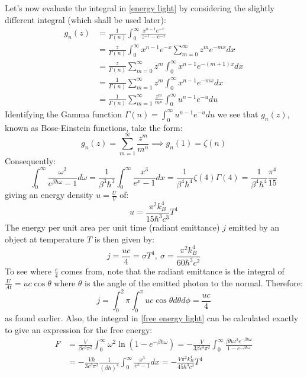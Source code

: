 \documentclass[a4paper,11pt,oneside]{book}
\begin{document}
Let's now evaluate the integral in \eqref{energy light} by considering the slightly different integral (which shall be used later):
\begin{align}
    g_n(z) &= \frac{1}{\Gamma(n)} \int_0^\infty \frac{x^{n-1}e^{-x}}{z^{-1}-e^{-x}}\\
    &=\frac{z}{\Gamma(n)} \int_0^\infty x^{n-1} e^{-x} \sum_{m=0}^\infty z^m e^{-mx} dx\\
    &=\frac{z}{\Gamma(n)}\sum_{m=0}^\infty z^m\int_0^\infty x^{n-1}  e^{-(m+1)x} dx\\
    &= \frac{1}{\Gamma(n)}\sum_{m=1}^\infty z^m\int_0^\infty  x^{n-1}  e^{-mx}dx\\
    &= \frac{1}{\Gamma(n)} \sum_{m=1}^\infty \frac{z^m}{m^n}\int_0^\infty u^{n-1} e^{-u} du 
\end{align}
Identifying the Gamma function $\Gamma(n) = \int_0^\infty u^{n-1} e^{-u} du $ we see that $g_n(z)$, known as Bose-Einstein functions, take the form:
\begin{equation}
    \boxed{g_n(z) =  \sum_{m=1}^\infty \frac{z^m}{m^n} \implies g_n(1) = \zeta(n)}
\end{equation}
Consequently:
\begin{equation}
    \int_0^\infty \frac{\omega^3}{e^{\beta \hbar \omega}-1}d\omega = \frac{1}{\beta^3 \hbar^3} \int_0^\infty \frac{x^3}{e^x-1} dx = \frac{1}{\beta^4 \hbar^4} \zeta(4) \Gamma(4)=\frac{1}{\beta^4 \hbar^4} \frac{\pi^4}{15}
\end{equation}
giving an energy density $u=\frac{U}{V}$ of:
\begin{equation}
   \boxed{u = \frac{\pi^2k_B^4}{15\hbar^3 c^3}T^4}
\end{equation}
The energy per unit area per unit time (radiant emittance) $j$ emitted by an object at temperature $T$ is then given by:
\begin{equation}
     \boxed{j = \frac{uc}{4}=\sigma T^4, \ \sigma = \frac{\pi^2k_B^4}{60\hbar^3 c^2}}
\end{equation}
To see where $\frac{c}{4}$ comes from, note that the radiant emittance is the integral of $\frac{U}{A t} = uc \cos \theta$ where $\theta$ is the angle of the emitted photon to the normal. Therefore:
\begin{equation}
    j = \int_0^2\pi \int_0^\pi uc \cos \theta d\theta d\phi = \frac{uc}{4}
\end{equation}
as found earlier. Also, the integral in \eqref{free energy light} can be calculated exactly to give an expression for the free energy:
\begin{align}
    F &= \frac{V}{\beta c^3 \pi^2} \int_0^\infty \omega^2 \ln(1-e^{-\beta \hbar \omega})=-\frac{V}{3\beta c^3 \pi^2} \int_0^\infty \frac{\beta \hbar \omega^3e^{-\beta \hbar \omega}}{1-e^{-\beta \hbar \omega}}\\
    &=-\frac{V\hbar}{3c^3 \pi^2}\frac{1}{(\beta \hbar)^4} \int_0^\infty\frac{x^3}{e^x-1} dx
    = -\frac{V \pi^2 k_B^4}{45 \hbar^3 c^3}T^4
\end{align}
\end{document}
